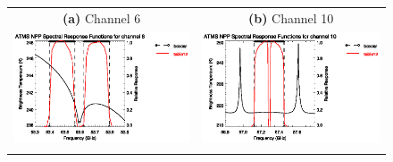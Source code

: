 \begin{figure}[htp]
  \centering
  \begin{tabular}{c c}
    \textsf{\textbf{(a)} Channel 6} &
    \textsf{\textbf{(b)} Channel 10} \\
    \includegraphics[bb=70 400 300 559,clip,scale=1.0]{graphics/srf/table12/atms_npp.ch6.osrf.eps} &
    \includegraphics[bb=70 400 300 559,clip,scale=1.0]{graphics/srf/table12/atms_npp.ch10.osrf.eps} \\\\


\end{tabular}
\end{figure}
